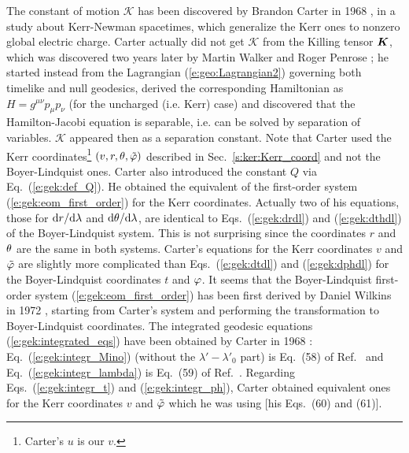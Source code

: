 \begin{hist}
The constant of motion $\mathscr{K}$ has been discovered by Brandon Carter
in 1968 \cite{Carte68a}, in a study about  Kerr-Newman spacetimes,
which generalize the Kerr ones to nonzero global electric charge.
Carter actually did not get $\mathscr{K}$ from the Killing tensor $\bm{K}$,
which was discovered two years later by Martin Walker and
Roger Penrose \cite{WalkeP70}; he
started instead from the Lagrangian (\ref{e:geo:Lagrangian2}) governing
both timelike and null geodesics,
derived the corresponding
Hamiltonian as $H = g^{\mu\nu} p_\mu p_\nu$ (for the uncharged (i.e. Kerr) case)
and discovered that the Hamilton-Jacobi equation
is separable, i.e. can be solved by separation of variables.
$\mathscr{K}$ appeared then as a separation constant. Note that Carter used
the Kerr coordinates\footnote{Carter's $u$ is our $v$.}
$(v,r,\theta,{\tilde\varphi})$ described in Sec.~\ref{s:ker:Kerr_coord}
and not the Boyer-Lindquist ones.
Carter also introduced
the constant $Q$ via Eq.~(\ref{e:gek:def_Q}). He obtained the equivalent
of the first-order system (\ref{e:gek:eom_first_order}) for the Kerr coordinates. Actually
two of his equations, those for $\mathrm{d} r/\mathrm{d}\lambda$ and $\mathrm{d}\theta/\mathrm{d}\lambda$, are
identical to Eqs.~(\ref{e:gek:drdl}) and (\ref{e:gek:dthdl}) of the Boyer-Lindquist
system. This is not surprising since the coordinates
$r$ and $\theta$ are the same in both systems. Carter's equations for the
Kerr coordinates $v$ and ${\tilde\varphi}$ are slightly more complicated than
Eqs.~(\ref{e:gek:dtdl}) and (\ref{e:gek:dphdl}) for the Boyer-Lindquist coordinates
$t$ and $\varphi$. It seems that the Boyer-Lindquist first-order system (\ref{e:gek:eom_first_order})
has been first derived by Daniel Wilkins in 1972 \cite{Wilki72},
starting from Carter's system and performing the transformation to Boyer-Lindquist
coordinates. The integrated geodesic equations (\ref{e:gek:integrated_eqs}) have
been obtained by Carter in 1968 \cite{Carte68a}: Eq.~(\ref{e:gek:integr_Mino})
(without the $\lambda' - \lambda'_0$ part) is Eq.~(58) of Ref.~\cite{Carte68a}
and Eq.~(\ref{e:gek:integr_lambda}) is Eq.~(59) of Ref.~\cite{Carte68a}.
Regarding Eqs.~(\ref{e:gek:integr_t}) and (\ref{e:gek:integr_ph}), Carter
obtained equivalent ones for the Kerr coordinates $v$ and ${\tilde\varphi}$ which he was using
[his Eqs.~(60) and (61)].
\end{hist}


